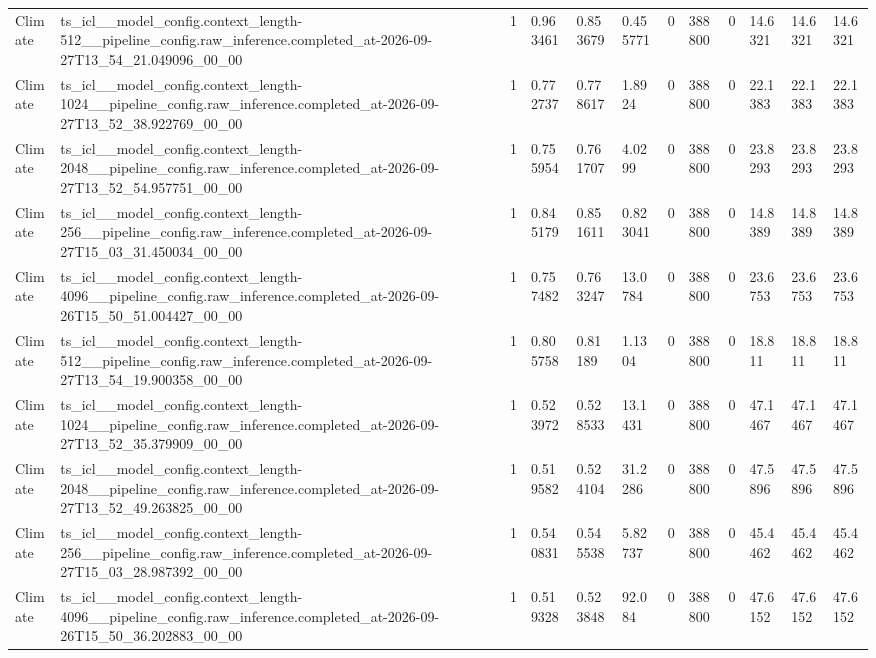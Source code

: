 \begin{tabular}{llllllllllll}
Climate & ts\_icl\_\_model\_config.context\_length-512\_\_pipeline\_config.raw\_inference.completed\_at-2026-09-27T13\_54\_21.049096\_00\_00 & 1 & 0.963461 & 0.853679 & 0.455771 & 0 & 388800 & 0 & 14.6321 & 14.6321 & 14.6321 \\
Climate & ts\_icl\_\_model\_config.context\_length-1024\_\_pipeline\_config.raw\_inference.completed\_at-2026-09-27T13\_52\_38.922769\_00\_00 & 1 & 0.772737 & 0.778617 & 1.8924 & 0 & 388800 & 0 & 22.1383 & 22.1383 & 22.1383 \\
Climate & ts\_icl\_\_model\_config.context\_length-2048\_\_pipeline\_config.raw\_inference.completed\_at-2026-09-27T13\_52\_54.957751\_00\_00 & 1 & 0.755954 & 0.761707 & 4.0299 & 0 & 388800 & 0 & 23.8293 & 23.8293 & 23.8293 \\
Climate & ts\_icl\_\_model\_config.context\_length-256\_\_pipeline\_config.raw\_inference.completed\_at-2026-09-27T15\_03\_31.450034\_00\_00 & 1 & 0.845179 & 0.851611 & 0.823041 & 0 & 388800 & 0 & 14.8389 & 14.8389 & 14.8389 \\
Climate & ts\_icl\_\_model\_config.context\_length-4096\_\_pipeline\_config.raw\_inference.completed\_at-2026-09-26T15\_50\_51.004427\_00\_00 & 1 & 0.757482 & 0.763247 & 13.0784 & 0 & 388800 & 0 & 23.6753 & 23.6753 & 23.6753 \\
Climate & ts\_icl\_\_model\_config.context\_length-512\_\_pipeline\_config.raw\_inference.completed\_at-2026-09-27T13\_54\_19.900358\_00\_00 & 1 & 0.805758 & 0.81189 & 1.1304 & 0 & 388800 & 0 & 18.811 & 18.811 & 18.811 \\
Climate & ts\_icl\_\_model\_config.context\_length-1024\_\_pipeline\_config.raw\_inference.completed\_at-2026-09-27T13\_52\_35.379909\_00\_00 & 1 & 0.523972 & 0.528533 & 13.1431 & 0 & 388800 & 0 & 47.1467 & 47.1467 & 47.1467 \\
Climate & ts\_icl\_\_model\_config.context\_length-2048\_\_pipeline\_config.raw\_inference.completed\_at-2026-09-27T13\_52\_49.263825\_00\_00 & 1 & 0.519582 & 0.524104 & 31.2286 & 0 & 388800 & 0 & 47.5896 & 47.5896 & 47.5896 \\
Climate & ts\_icl\_\_model\_config.context\_length-256\_\_pipeline\_config.raw\_inference.completed\_at-2026-09-27T15\_03\_28.987392\_00\_00 & 1 & 0.540831 & 0.545538 & 5.82737 & 0 & 388800 & 0 & 45.4462 & 45.4462 & 45.4462 \\
Climate & ts\_icl\_\_model\_config.context\_length-4096\_\_pipeline\_config.raw\_inference.completed\_at-2026-09-26T15\_50\_36.202883\_00\_00 & 1 & 0.519328 & 0.523848 & 92.084 & 0 & 388800 & 0 & 47.6152 & 47.6152 & 47.6152 \\

\end{tabular}
